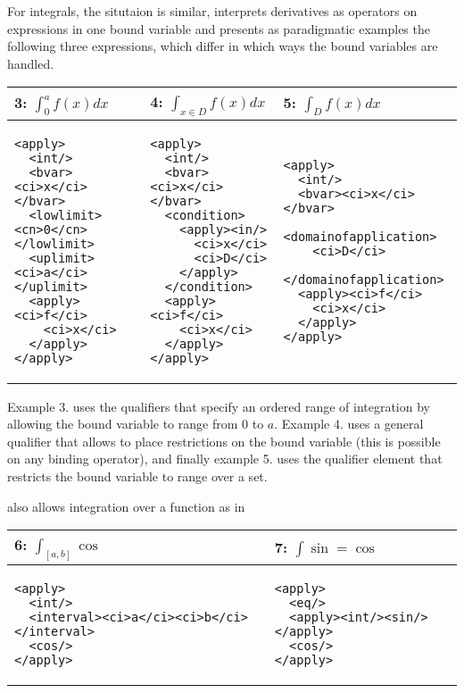 \documentclass[12pt]{article}
\begin{document}
For integrals, the situtaion is similar, {\mathml} interprets derivatives as operators on
expressions in one bound variable and presents as paradigmatic examples the following
three expressions, which differ in which ways the bound variables are handled.
\begin{center}\lstset{frame=none,numbers=none,lineskip=-.7ex,aboveskip=-.5em,belowskip=-1em,language=MathML}
\begin{tabular}{|p{5.9cm}|p{4.4cm}|p{4.4cm}|}\hline
  3: $\int_0^af(x) dx$ & 4: $\int_{x\in D}f(x) dx$ & 5: $\int_Df(x)dx$\\\hline
\begin{lstlisting}
<apply>
  <int/>
  <bvar><ci>x</ci></bvar>
  <lowlimit><cn>0</cn></lowlimit>
  <uplimit><ci>a</ci></uplimit>
  <apply><ci>f</ci>
    <ci>x</ci>
  </apply>
</apply>
\end{lstlisting}
&
\begin{lstlisting}[language=MathML]
<apply>
  <int/>
  <bvar><ci>x</ci></bvar>
  <condition>
    <apply><in/>
      <ci>x</ci>
      <ci>D</ci>
    </apply>
  </condition>
  <apply><ci>f</ci>
    <ci>x</ci>
  </apply>
</apply>
\end{lstlisting}
&
\begin{lstlisting}[language=MathML]
<apply>
  <int/>
  <bvar><ci>x</ci></bvar>
  <domainofapplication>
    <ci>D</ci>
  </domainofapplication>
  <apply><ci>f</ci>
    <ci>x</ci>
  </apply>
</apply>
\end{lstlisting}
\\\hline
\end{tabular}
\end{center}
Example 3. uses the {} {} qualifiers that specify an
ordered range of integration by allowing the bound variable to range from 0 to
$a$. Example 4. uses a general {} qualifier that allows to place
restrictions on the bound variable (this is possible on any binding operator), and finally
example 5. uses the {} qualifier element that restricts the
bound variable to range over a set. 

{} also allows integration over a function as in
\begin{center}\lstset{frame=none,numbers=none,lineskip=-.7ex,aboveskip=-.5em,belowskip=-1em,language=MathML}
\begin{tabular}{|p{7.7cm}|p{5.3cm}|}\hline
  6: $\int_{[a,b]}\cos$ & 7: $\int\sin=\cos$\\\hline
\begin{lstlisting}
<apply>
  <int/>
  <interval><ci>a</ci><ci>b</ci></interval>
  <cos/>
</apply>
\end{lstlisting}
&
\begin{lstlisting}
<apply>
  <eq/>
  <apply><int/><sin/></apply>
  <cos/>
</apply>
\end{lstlisting}
\\\hline
\end{tabular}
\end{center}
\end{document}
